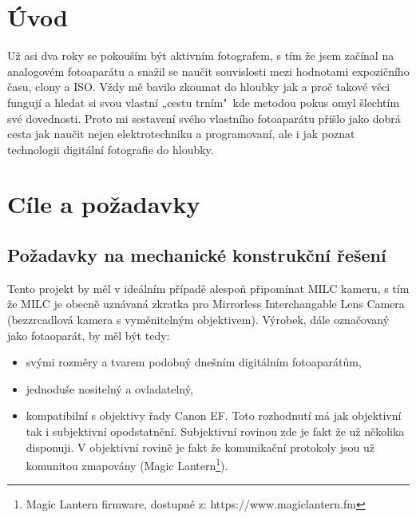 \documentclass[12pt, a4paper, oneside]{report}
\begin{document}
\newpage

\chapter*{Úvod}
Už asi dva roky se pokouším být aktivním fotografem, s tím že jsem začínal na analogovém fotoaparátu a snažil se naučit souvislosti mezi hodnotami expozičního času, clony a ISO. Vždy mě bavilo zkoumat do hloubky jak a proč takové věci fungují a hledat si svou vlastní „cestu trním"~kde metodou pokus omyl šlechtím své dovednosti. Proto mi sestavení svého vlastního fotoaparátu přišlo jako dobrá cesta jak naučit nejen elektrotechniku a programovaní, ale i jak poznat technologii digitální fotografie do hloubky.

\chapter{Cíle a požadavky}
\section{Požadavky na mechanické konstrukční řešení}
Tento projekt by měl v ideálním případě alespoň připomínat MILC kameru, s tím že MILC je obecně uznávaná zkratka pro Mirrorless Interchangable Lens Camera (bezzrcadlová kamera s vyměnitelným objektivem). Výrobek, dále označovaný jako fotaoparát, by měl být tedy:
\begin{itemize}
    \item svými rozměry a tvarem podobný dnešním digitálním fotoaparátům,
    \item jednoduše nositelný a ovladatelný,
    \item kompatibilní s objektivy řady Canon EF. Toto rozhodnutí má jak objektivní tak i subjektivní opodstatnění. Subjektivní rovinou zde je fakt že už několika disponuji. V objektivní rovině je fakt že komunikační protokoly jsou už komunitou zmapovány (Magic Lantern\footnote{Magic Lantern firmware, dostupné z: https://www.magiclantern.fm}).
\end{itemize}
\end{document}
